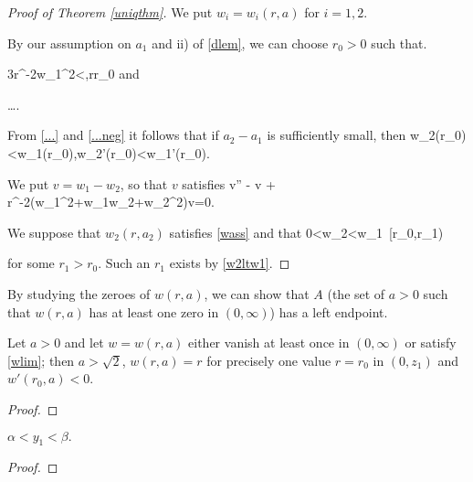 \begin{proof}[Proof of Theorem \ref{uniqthm}]
    We put $w_i=w_i(r, a)$ for $i=1, 2$. 

    By our assumption on $a_1$ and ii) of \cref{dlem}, we can choose $r_0>0$
    such that.

    \be\label{lbw1} 3r^{-2}w_1^2<,\quad r\geq r_0\ee
    and

    \be\label{...neg} \ldots.\ee

    From \cref{...} and \eqref{...neg} it follows that if $a_2-a_1$ is
    sufficiently small, then
    \be\label{w2ltw1} w_2(r_0)<w_1(r_0),\quad w_2'(r_0)<w_1'(r_0).\ee

    We put $v = w_1-w_2$, so that $v$ satisfies
    \be\label{vivp} v'' - v + r^{-2}\left(w_1^2+w_1w_2+w_2^2\right)v=0.\ee

    We suppose that $w_2(r,a_2)$ satisfies \eqref{wass} and that
    \be\label{w2ltw1r0r1} 0<w_2<w_1\quad{}~\left[r_0,r_1\right)\ee

    for some $r_1>r_0$. Such an $r_1$ exists by \eqref{w2ltw1}.


\end{proof}

% 
% 
By studying the zeroes of $w(r,a)$, we can show that $A$ (the set of $a>0$
such that $w(r, a)$ has at least one zero in $(0, \infty)$) has a left
endpoint.

\begin{lemma}
Let $a>0$ and let $w=w(r,a)$ either vanish at least once in $(0, \infty)$
    or satisfy \eqref{wlim}; then $a>\sqrt{2}$, $w(r, a)=r$ for precisely one value
$r=r_0$ in $(0, z_1)$ and $w'(r_0, a)<0$.
\end{lemma}
\begin{proof}
\end{proof}

\begin{lemma}
    $\alpha < y_1 < \beta.$
\end{lemma}
\begin{proof}
\end{proof}


